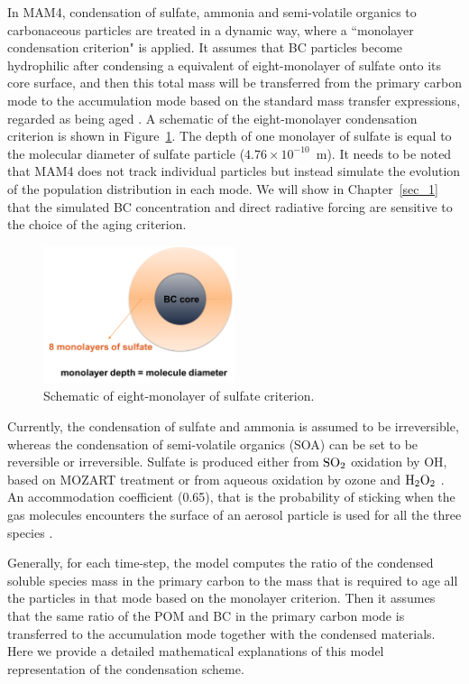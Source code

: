 \documentclass[12pt, fullpage]{uiucthesis2009_2}
\begin{document}
	In MAM4, condensation of sulfate, ammonia and semi-volatile organics to carbonaceous particles are treated in a dynamic way, where a ``monolayer condensation criterion" is applied. It assumes that BC particles become hydrophilic after condensing a equivalent of eight-monolayer of sulfate onto its core surface, and then this total mass will be transferred from the primary carbon mode to the accumulation mode based on the standard mass transfer expressions, regarded as being aged \citep{Liu2012}. A schematic of the eight-monolayer condensation criterion is shown in Figure~\ref{fig_P3}. The depth of one monolayer of sulfate is equal to the molecular diameter of sulfate particle ($4.76\times 10^{-10}$~m). It needs to be noted that MAM4 does not track individual particles but instead simulate the evolution of the population distribution in each mode. We will show in Chapter~\ref{sec_1} that the simulated BC concentration and direct radiative forcing are sensitive to the choice of the aging criterion.
	\begin{figure}[h] 
		\begin{center}
			\includegraphics[width = 0.5\textwidth]{Figure03}
			\caption[Schematic of eight-monolayer of sulfate criterion]{\label{fig_P3} Schematic of eight-monolayer of sulfate criterion.}
		\end{center}
	\end{figure}
	
	Currently, the condensation of sulfate and ammonia is assumed to be irreversible, whereas the condensation of semi-volatile organics (SOA) can be set to be reversible or irreversible. Sulfate is produced either from $\rm{SO}_{2}$ oxidation by OH, based on MOZART treatment or from aqueous oxidation by ozone and $\rm H_{2}O_{2}$ \citep{tie2001effects}. An accommodation coefficient (0.65), that is the probability of sticking when the gas molecules encounters the surface of an aerosol particle is used for all the three species \citep{Liu2012}. 
	
	Generally, for each time-step, the model computes the ratio of the condensed soluble species mass in the primary carbon to the mass that is required to age all the particles in that mode based on the monolayer criterion. Then it assumes that the same ratio of the POM and BC in the primary carbon mode is transferred to the accumulation mode together with the condensed materials. Here we provide a detailed mathematical explanations of this model representation of the condensation scheme. 
	
\end{document}
